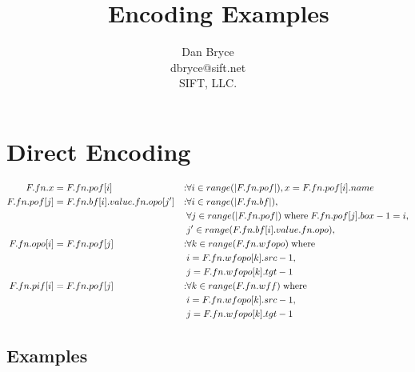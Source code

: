\documentclass{article}
\author{Dan Bryce\\dbryce@sift.net\\SIFT, LLC.}
\title{\sn~ Encoding Examples}
\begin{document}

\maketitle

\section{Direct Encoding}

\begin{align}
    F.fn.x &= F.fn.pof[i] & :& \forall i \in range(|F.fn.pof|), x = F.fn.pof[i].name\\
    F.fn.pof[j] &= F.fn.bf[i].value.fn.opo[j']  & :& \forall i \in range(|F.fn.bf|), \notag \\
    &&& \forall j \in range(|F.fn.pof|) \;\text{where}\; F.fn.pof[j].box-1 = i,\notag \\
    &&& j' \in range(F.fn.bf[i].value.fn.opo),\\
    F.fn.opo[i] &= F.fn.pof[j] &:& \forall k \in range(F.fn.wfopo)\;\text{where} \notag \\ 
    &&&i = F.fn.wfopo[k].src-1,\notag\\
    &&& j = F.fn.wfopo[k].tgt-1\\
    F.fn.pif[i] &= F.fn.pof[j] &:& \forall k \in range(F.fn.wff)\;\text{where} \notag \\ 
    &&&i = F.fn.wfopo[k].src-1,\notag\\
    &&& j = F.fn.wfopo[k].tgt-1\\
\end{align}

\subsection{Examples}
\end{document}
